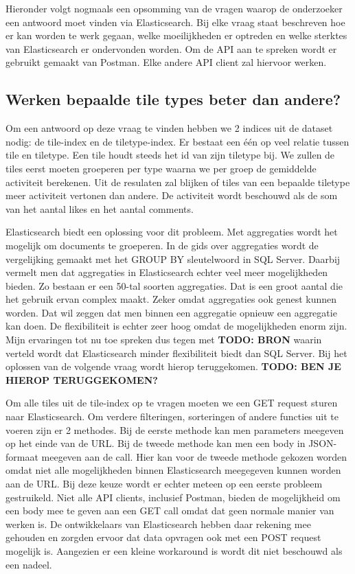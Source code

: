 Hieronder volgt nogmaals een opsomming van de vragen waarop de onderzoeker een antwoord moet vinden via Elasticsearch. Bij elke vraag staat beschreven hoe er kan worden te werk gegaan, welke moeilijkheden er optreden en welke sterktes van Elasticsearch er ondervonden worden. Om de API aan te spreken wordt er gebruikt gemaakt van Postman. Elke andere API client zal hiervoor werken.

\subsection{Werken bepaalde tile types beter dan andere?}
Om een antwoord op deze vraag te vinden hebben we 2 indices uit de dataset nodig: de tile-index en de tiletype-index. Er bestaat een één op veel relatie tussen tile en tiletype. Een tile houdt steeds het id van zijn tiletype bij. We zullen de tiles eerst moeten groeperen per type waarna we per groep de gemiddelde activiteit berekenen. Uit de resulaten zal blijken of tiles van een bepaalde tiletype meer activiteit vertonen dan andere. De activiteit wordt beschouwd als de som van het aantal likes en het aantal comments.

Elasticsearch biedt een oplossing voor dit probleem. Met aggregaties wordt het mogelijk om documents te groeperen. In de gids over aggregaties wordt de vergelijking gemaakt met het GROUP BY sleutelwoord in SQL Server. Daarbij vermelt men dat aggregaties in Elasticsearch echter veel meer mogelijkheden bieden. Zo bestaan er een 50-tal soorten aggregaties. Dat is een groot aantal die het gebruik ervan complex maakt. Zeker omdat aggregaties ook genest kunnen worden. Dat wil zeggen dat men binnen een aggregatie opnieuw een aggregatie kan doen. De flexibiliteit is echter zeer hoog omdat de mogelijkheden enorm zijn. Mijn ervaringen tot nu toe spreken dus tegen met \textbf{TODO: BRON} waarin verteld wordt dat Elasticsearch minder flexibiliteit biedt dan SQL Server. Bij het oplossen van de volgende vraag wordt hierop teruggekomen. \textbf{TODO: BEN JE HIEROP TERUGGEKOMEN?}

Om alle tiles uit de tile-index op te vragen moeten we een GET request sturen naar Elasticsearch. Om verdere filteringen, sorteringen of andere functies uit te voeren zijn er 2 methodes. Bij de eerste methode kan men parameters meegeven op het einde van de URL. Bij de tweede methode kan men een body in JSON-formaat meegeven aan de call. Hier kan voor de tweede methode gekozen worden omdat niet alle mogelijkheden binnen Elasticsearch meegegeven kunnen worden aan de URL. Bij deze keuze wordt er echter meteen op een eerste probleem gestruikeld. Niet alle API clients, inclusief Postman, bieden de mogelijkheid om een body mee te geven aan een GET call omdat dat geen normale manier van werken is. De ontwikkelaars van Elasticsearch hebben daar rekening mee gehouden en zorgden ervoor dat data opvragen ook met een POST request mogelijk is. Aangezien er een kleine workaround is wordt dit niet beschouwd als een nadeel.

